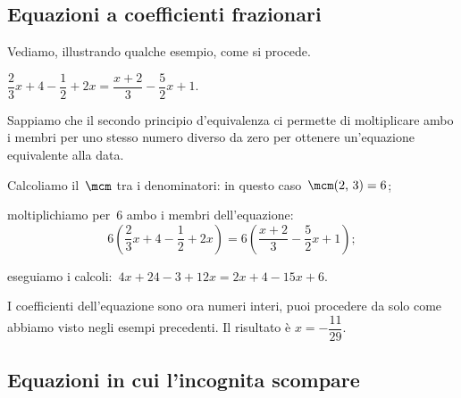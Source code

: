 \ovalbox{\ref{ese:15.14}, \ref{ese:15.15}, \ref{ese:15.16}, \ref{ese:15.17}, \ref{ese:15.18}, \ref{ese:15.19}, \ref{ese:15.20}, \ref{ese:15.21}, \ref{ese:15.22}}

\subsection{Equazioni a coefficienti frazionari}
Vediamo, illustrando qualche esempio, come si procede.

\begin{exrig}
 \begin{esempio}
$\dfrac{2}{3}x+4-\dfrac{1}{2}+2x=\dfrac{x+2}{3}-\dfrac{5}{2}x+1$.

Sappiamo che il secondo principio d'equivalenza ci
permette di moltiplicare ambo i membri per uno stesso numero diverso da
zero per ottenere un'equazione equivalente alla data.
\begin{enumeratea}
\item Calcoliamo il~$\mcm$ tra i denominatori: in questo
caso~$\mcm(2\text{,~}3) = 6$;

\item moltiplichiamo per~6 ambo i membri
dell'equazione:
\[6\left(\dfrac{2}{3}x+4-\dfrac{1}{2}+2x\right)=6\left(\dfrac{x+2}{3}-\dfrac{5}{2}x+1\right);\]

\item eseguiamo i calcoli:~$4x+24-3+12x=2x+4-15x+6$.
\end{enumeratea}

I coefficienti dell'equazione sono ora numeri interi,
puoi procedere da solo come abbiamo visto negli esempi precedenti. Il risultato è $x=-\dfrac{11}{29}$.
\end{esempio}
\end{exrig}

\ovalbox{\risolvii \ref{ese:15.23}, \ref{ese:15.24}}

\subsection{Equazioni in cui l'incognita scompare}

